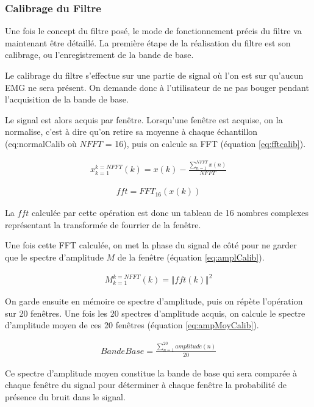 \documentclass[letterpaper, twoside, 12pt, memoire, creativecommons, hyperref]{thETS}
\begin{document}
\subsubsection{Calibrage du Filtre}

Une fois le concept du filtre posé, le mode de fonctionnement précis du filtre va maintenant être détaillé. La première étape de la réalisation du filtre est son calibrage, ou l'enregistrement de la bande de base. 

Le calibrage du filtre s'effectue sur une partie de signal où l'on est sur qu'aucun EMG ne sera présent. On demande donc à l'utilisateur de ne pas bouger pendant l'acquisition de la bande de base. 

Le signal est alors acquis par fenêtre. Lorsqu'une fenêtre est acquise, on la normalise, c'est à dire qu'on retire sa moyenne à chaque échantillon (eq:normalCalib où $NFFT$ = 16), puis on calcule sa FFT (équation \ref{eq:fftcalib}).

\begin{align}\label{eq:normalCalib}
   x_{k=1}^{k=NFFT}(k) = x(k) - \frac{\sum_{n=1}^{NFFT}x(n)}{NFFT}
\end{align}

\begin{align}\label{eq:fftcalib}
   fft = FFT_{16}(x(k)) 
\end{align}

La $fft$ calculée par cette opération est donc un tableau de 16 nombres complexes représentant la transformée de fourrier de la fenêtre.

Une fois cette FFT calculée, on met la phase du signal de côté pour ne garder que le spectre d'amplitude $M$ de la fenêtre (équation \ref{eq:amplCalib}).

\begin{align}\label{eq:amplCalib}
   M_{k=1}^{k=NFFT}(k) = \Vert fft(k) \Vert^2 
\end{align}

On garde ensuite en mémoire ce spectre d'amplitude, puis on répète l'opération sur 20 fenêtres. Une fois les 20 spectres d'amplitude acquis, on calcule le spectre d'amplitude moyen de ces 20 fenêtres (équation \ref{eq:ampMoyCalib}).

\begin{align}\label{eq:ampMoyCalib}
   BandeBase = \frac{\sum_{n=1}^{20}amplitude(n)}{20}
\end{align}

Ce spectre d'amplitude moyen constitue la bande de base qui sera comparée à chaque fenêtre du signal pour déterminer à chaque fenêtre la probabilité de présence du bruit dans le signal.
\end{document}
